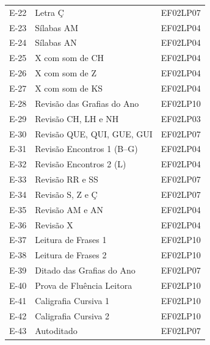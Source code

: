 \begin{center}
\begin{tabular}{lll}
E-22 & Letra Ç & EF02LP07 \\

E-23 & Sílabas AM & EF02LP04 \\

E-24 & Sílabas AN & EF02LP04 \\

E-25 & X com som de CH & EF02LP04 \\

E-26 & X com som de Z & EF02LP04 \\

E-27 & X com som de KS & EF02LP04 \\

E-28 & Revisão das Grafias do Ano & EF02LP10 \\

E-29 & Revisão CH, LH e NH & EF02LP03 \\

E-30 & Revisão QUE, QUI, GUE, GUI & EF02LP07 \\

E-31 & Revisão Encontros 1 (B–G) & EF02LP04 \\

E-32 & Revisão Encontros 2 (L) & EF02LP04 \\

E-33 & Revisão RR e SS & EF02LP07 \\

E-34 & Revisão S, Z e Ç & EF02LP07 \\

E-35 & Revisão AM e AN & EF02LP04 \\

E-36 & Revisão X & EF02LP04 \\

E-37 & Leitura de Frases 1 & EF02LP10 \\

E-38 & Leitura de Frases 2 & EF02LP10 \\

E-39 & Ditado das Grafias do Ano & EF02LP07 \\

E-40 & Prova de Fluência Leitora & EF02LP10 \\

E-41 & Caligrafia Cursiva 1 & EF02LP10 \\

E-42 & Caligrafia Cursiva 2 & EF02LP10 \\

E-43 & Autoditado & EF02LP07 \\


\end{tabular}
\end{center}
